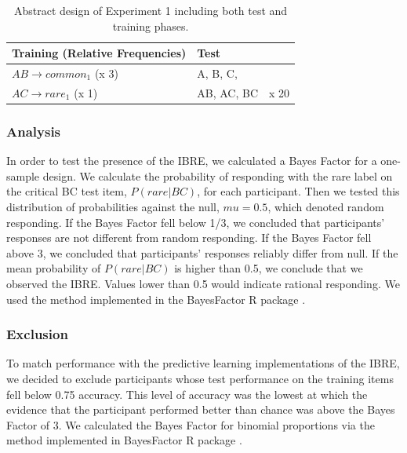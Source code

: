 \documentclass[10pt,letterpaper]{article}
\begin{document}
\begin{table}[!ht]
  \begin{center}
    \caption{Abstract design of Experiment 1 including both test and training phases. \\}
    \label{tab:abstract-exp1}
    \begin{tabular}{llr} %
      \textbf{Training (Relative Frequencies)} & \textbf{Test}& \\
      \hline
      $AB \to common_{1}$ (x 3) &  A, B, C,         &  \\
      $AC \to rare_{1}$   (x 1) &  AB, AC, BC      & x 20 \\
      \hline
    \end{tabular}
  \end{center}
\end{table}

\subsubsection{Analysis}

In order to test the presence of the IBRE, we calculated a Bayes Factor for a one-sample design.
We calculate the probability of responding with the rare label on the critical BC test item, $P(rare|BC)$, for each participant.
Then we tested this distribution of probabilities against the null, $mu = 0.5$, which denoted random responding.
If the Bayes Factor fell below 1/3, we concluded that participants' responses are not different from random responding.
If the Bayes Factor fell above 3, we concluded that participants' responses reliably differ from null.
If the mean probability of $P(rare|BC)$ is higher than 0.5, we conclude that we observed the IBRE.
Values lower than 0.5 would indicate rational responding.
We used the method implemented in the BayesFactor R package \cite{morey2022bayes}.

\subsubsection{Exclusion}

To match performance with the predictive learning implementations of the IBRE, we decided to exclude participants whose test performance on the training items fell below 0.75 accuracy.
This level of accuracy was the lowest at which the evidence that the participant performed better than chance was above the Bayes Factor of 3.
We calculated the Bayes Factor for binomial proportions via the method implemented in BayesFactor R package \cite{morey2022bayes}.
\end{document}
